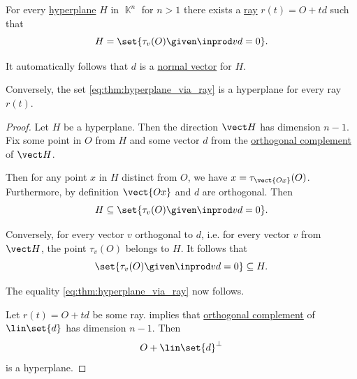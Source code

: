 \begin{proposition}\label{thm:hyperplane_via_ray}
  For every \hyperref[def:affine_hyperplane]{hyperplane} \( H \) in \( \BbbK^n \) for \( n > 1 \) there exists a \hyperref[def:geometric_ray]{ray} \( r(t) = O + td \) such that
  \begin{equation}\label{eq:thm:hyperplane_via_ray}
    H = \set{ \tau_v(O) \given \inprod v d = 0 }.
  \end{equation}

  It automatically follows that \( d \) is a \hyperref[def:normal_vector]{normal vector} for \( H \).

  Conversely, the set \eqref{eq:thm:hyperplane_via_ray} is a hyperplane for every ray \( r(t) \).
\end{proposition}
\begin{proof}
  \SufficiencySubProof Let \( H \) be a hyperplane. Then the direction \( \vect H \) has dimension \( n - 1 \). Fix some point in \( O \) from \( H \) and some vector \( d \) from the \hyperref[def:orthogonal_complement]{orthogonal complement} of \( \vect H \).

  Then for any point \( x \) in \( H \) distinct from \( O \), we have \( x = \tau_{\vect{Ox}}(O) \). Furthermore, by definition \( \vect{Ox} \) and \( d \) are orthogonal. Then
  \begin{equation*}
    H \subseteq \set{ \tau_v(O) \given \inprod v d = 0 }.
  \end{equation*}

  Conversely, for every vector \( v \) orthogonal to \( d \), i.e. for every vector \( v \) from \( \vect H \), the point \( \tau_v(O) \) belongs to \( H \). It follows that
  \begin{equation*}
    \set{ \tau_v(O) \given \inprod v d = 0 } \subseteq H.
  \end{equation*}

  The equality \eqref{eq:thm:hyperplane_via_ray} now follows.

  \NecessitySubProof Let \( r(t) = O + td \) be some ray.  implies that \hyperref[def:orthogonal_complement]{orthogonal complement} of \( \lin\set{ d } \) has dimension \( n - 1 \). Then
  \begin{equation*}
    O + \lin\set{ d }^\perp
  \end{equation*}
  is a hyperplane.
\end{proof}

